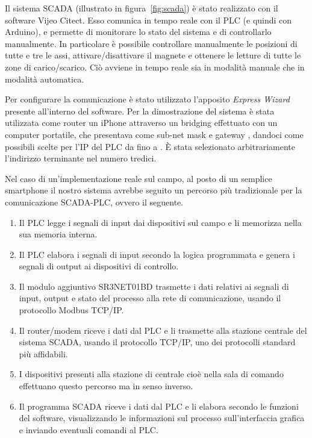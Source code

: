 Il sistema SCADA (illustrato in figura~\ref{fig:scada}) è stato realizzato con il software Vijeo
Citect. Esso comunica in tempo reale con il PLC (e quindi con Arduino), e permette di monitorare lo
stato del sistema e di controllarlo manualmente. In particolare è possibile controllare manualmente
le posizioni di tutte e tre le assi, attivare/disattivare il magnete e ottenere le letture di tutte
le zone di carico/scarico. Ciò avviene in tempo reale sia in modalità manuale che in modalità
automatica.

Per configurare la comunicazione è stato utilizzato l'apposito \emph{Express Wizard} presente
all'interno del software. Per la dimostrazione del sistema è stata utilizzata come router un iPhone
attraverso un bridging effettuato con un computer portatile, che presentava come sub-net mask
 e gateway , dandoci come possibili scelte per l'IP del PLC
da  fino a . È stata selezionato arbitrariamente l'indirizzo
terminante nel numero tredici.

Nel caso di un'implementazione reale sul campo, al posto di un semplice smartphone il nostro sistema
avrebbe seguito un percorso più tradizionale per la comunicazione SCADA-PLC, ovvero il seguente.
\begin{enumerate}
    \item Il PLC legge i segnali di input dai dispositivi sul campo e li memorizza nella sua memoria
        interna.
    \item Il PLC elabora i segnali di input secondo la logica programmata e genera i segnali di
        output ai dispositivi di controllo.
    \item Il modulo aggiuntivo SR3NET01BD trasmette i dati relativi ai segnali di input, output e stato del processo alla
        rete di comunicazione, usando il protocollo Modbus TCP/IP.
    \item Il router/modem riceve i dati dal PLC e li trasmette alla stazione centrale del sistema
        SCADA, usando il protocollo TCP/IP, uno dei protocolli standard più affidabili.
    \item I dispositivi presenti alla stazione di centrale cioè nella sala di comando effettuano
        questo percorso ma in senso inverso.
    \item Il programma SCADA riceve i dati dal PLC e li elabora secondo le funzioni del software,
        visualizzando le informazioni sul processo sull'interfaccia grafica e inviando eventuali
        comandi al PLC.
\end{enumerate}

